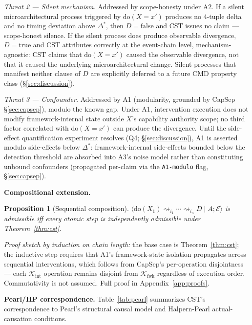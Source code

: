 \documentclass[conference]{IEEEtran}
\newtheorem{proposition}{Proposition}
\newcommand{\Kint}{\mathcal{K}_\text{int}}
\newcommand{\Kfwk}{\mathcal{K}_\text{fwk}}
\newcommand{\Dstar}{\Delta^{*}}
\newcommand{\dox}[1]{\text{do}(X{=}#1)}
\begin{document}
\emph{Threat 2 --- Silent mechanism.} Addressed by scope-honesty
under A2. If a silent microarchitectural process triggered by
$\dox{x'}$ produces no 4-tuple delta and no timing deviation above
$\Dstar$, then $D = \text{false}$ and CST issues no claim ---
scope-honest silence. If the silent process does produce observable
divergence, $D = \text{true}$ and CST attributes correctly at the
event-chain level, mechanism-agnostic: CST claims that $\dox{x'}$
caused the observable divergence, not that it caused the underlying
microarchitectural change. Silent processes that manifest neither
clause of $D$ are explicitly deferred to a future CMD
property class (\S\ref{sec:discussion}).

\emph{Threat 3 --- Confounder.} Addressed by A1 (modularity,
grounded by CapSep \S\ref{sec:capsep}), modulo the known gap. Under
A1, intervention execution does not modify framework-internal state
outside $X$'s capability authority scope; no third factor correlated
with $\dox{x'}$ can produce the divergence. Until the side-effect
quantification experiment resolves (Q4; \S\ref{sec:discussion}), A1
is asserted modulo side-effects below $\Dstar$: framework-internal
side-effects bounded below the detection threshold are absorbed into
A3's noise model rather than constituting unbound confounders
(propagated per-claim via the \texttt{A1-modulo} flag,
\S\ref{sec:capsep}).

\textbf{Compositional extension.}
\begin{proposition}[Sequential composition]
$\langle \text{do}(X_1) \rightsquigarrow_{i_1} \cdots
\rightsquigarrow_{i_n} D \mid A; \mathcal{E}\rangle$ is admissible
iff every atomic step is independently admissible under
Theorem~\ref{thm:cst}.
\end{proposition}

\emph{Proof sketch by induction on chain length:} the base case is
Theorem~\ref{thm:cst}; the inductive step requires that A1's
framework-state isolation propagates across sequential interventions,
which follows from CapSep's per-operation disjointness --- each
$\Kint$ operation remains disjoint from $\Kfwk$ regardless of
execution order. Commutativity is not assumed. Full proof in
Appendix~\ref{app:proofs}.

\textbf{Pearl/HP correspondence.}
Table~\ref{tab:pearl} summarizes CST's correspondence to Pearl's
structural causal model and Halpern-Pearl actual-causation
conditions.
\end{document}
